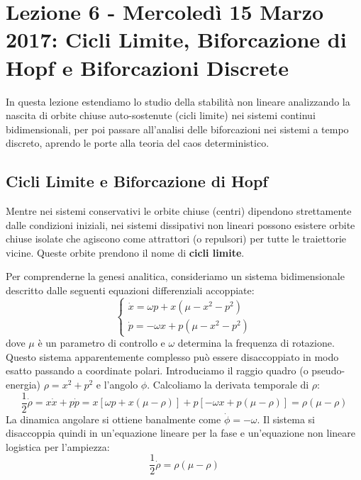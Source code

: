 \documentclass[12pt,a4paper]{article}
\begin{document}
\newpage
\section{Lezione 6 - Mercoledì 15 Marzo 2017: Cicli Limite, Biforcazione di Hopf e Biforcazioni Discrete}

In questa lezione estendiamo lo studio della stabilità non lineare analizzando la nascita di orbite chiuse auto-sostenute (cicli limite) nei sistemi continui bidimensionali, per poi passare all'analisi delle biforcazioni nei sistemi a tempo discreto, aprendo le porte alla teoria del caos deterministico.

\subsection{Cicli Limite e Biforcazione di Hopf}
Mentre nei sistemi conservativi le orbite chiuse (centri) dipendono strettamente dalle condizioni iniziali, nei sistemi dissipativi non lineari possono esistere orbite chiuse isolate che agiscono come attrattori (o repulsori) per tutte le traiettorie vicine. Queste orbite prendono il nome di \textbf{cicli limite}.

Per comprenderne la genesi analitica, consideriamo un sistema bidimensionale descritto dalle seguenti equazioni differenziali accoppiate:
\begin{equation}
\begin{cases}
\dot{x} = \omega p + x(\mu - x^2 - p^2) \\
\dot{p} = -\omega x + p(\mu - x^2 - p^2)
\end{cases}
\end{equation}
dove $\mu$ è un parametro di controllo e $\omega$ determina la frequenza di rotazione. 
Questo sistema apparentemente complesso può essere disaccoppiato in modo esatto passando a coordinate polari. Introduciamo il raggio quadro (o pseudo-energia) $\rho = x^2 + p^2$ e l'angolo $\phi$. Calcoliamo la derivata temporale di $\rho$:
\begin{equation}
\frac{1}{2}\dot{\rho} = x\dot{x} + p\dot{p} = x[\omega p + x(\mu - \rho)] + p[-\omega x + p(\mu - \rho)] = \rho(\mu - \rho)
\end{equation}
La dinamica angolare si ottiene banalmente come $\dot{\phi} = -\omega$. Il sistema si disaccoppia quindi in un'equazione lineare per la fase e un'equazione non lineare logistica per l'ampiezza:
\begin{equation}
\frac{1}{2}\dot{\rho} = \rho(\mu - \rho)
\end{equation}
\end{document}
